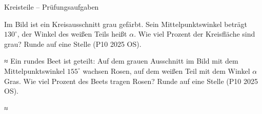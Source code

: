 \begin{aufgabe}{Kreisteile – Prüfungsaufgaben}
\begin{teile}
\teil Im Bild ist ein Kreisausschnitt grau gefärbt. Sein Mittelpunktswinkel beträgt $130^\circ$, der Winkel des weißen Teils heißt $\alpha$. Wie viel Prozent der Kreisfläche sind grau? Runde auf eine Stelle \hfill (P10 2025 OS).

≈ \leerfeld[\%]
\teil Ein rundes Beet ist geteilt: Auf dem grauen Ausschnitt im Bild mit dem Mittelpunktswinkel $155^\circ$ wachsen Rosen, auf dem weißen Teil mit dem Winkel $\alpha$ Gras. Wie viel Prozent des Beets tragen Rosen? Runde auf eine Stelle \hfill (P10 2025 OS).

≈ \leerfeld[\%]
\end{teile}
\end{aufgabe}
